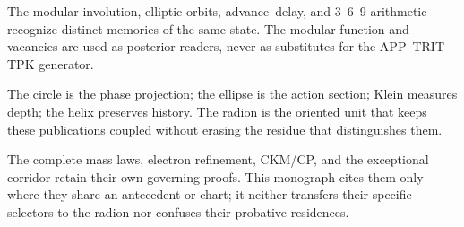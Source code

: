 \begin{narrativebox}[title={Modular, orbital, and arithmetic boundary characters}]
The modular involution, elliptic orbits, advance--delay, and
3--6--9 arithmetic recognize distinct memories of the same state. The modular function and
vacancies are used as posterior readers, never as substitutes for the
APP--TRIT--TPK generator.
\end{narrativebox}

\begin{thesisbox}[title={Operatorial synthesis of phase, action, depth, and memory}]
The circle is the phase projection; the ellipse is the action section; Klein
measures depth; the helix preserves history. The radion is the oriented unit
that keeps these publications coupled without erasing the residue that
distinguishes them.
\end{thesisbox}

\begin{statusbox}[title={Delimitation of domains and causal continuity}] The complete mass laws, electron refinement, CKM/CP, and the exceptional corridor retain their own governing proofs. This monograph cites them only where they share an antecedent or chart; it neither transfers their specific selectors to the radion nor confuses their probative residences.
\end{statusbox}
